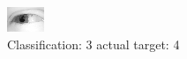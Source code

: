 \begin{figure}[h!]
\begin{center}
\includegraphics[width=0.60\columnwidth]{figures/ID2434_class_3_target_4.png}
\end{center}
\caption{ Classification: 3 actual target: 4}
\label{fig:ID2434_class_3_target_4}
\end{figure}
